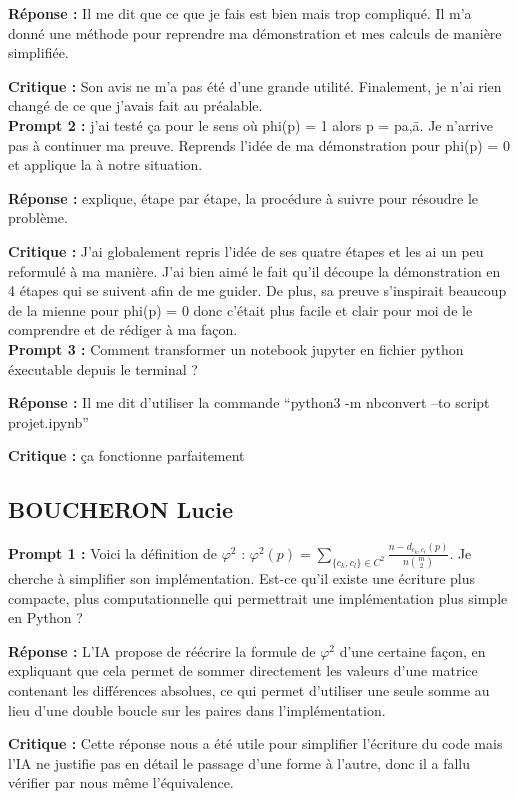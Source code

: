 \documentclass[11pt]{article}
\begin{document}
\textbf{Réponse :} Il me dit que ce que je fais est bien mais trop compliqué. Il m’a donné une méthode pour reprendre ma démonstration et mes calculs de manière simplifiée.

\textbf{Critique :} Son avis ne m’a pas été d’une grande utilité. Finalement, je n’ai rien changé de ce que j’avais fait au préalable.
\\

\textbf{Prompt 2 :} j’ai testé ça pour le sens où phi(p) = 1 alors p = pa,ā. Je n’arrive pas à continuer ma preuve. Reprends l’idée de ma démonstration pour phi(p) = 0 et applique la à notre situation.


\textbf{Réponse :} explique, étape par étape, la procédure à suivre pour résoudre le problème. 

\textbf{Critique :} J’ai globalement repris l’idée de ses quatre étapes et les ai un peu reformulé à ma manière. J’ai bien aimé le fait qu’il découpe la démonstration en 4 étapes qui se suivent afin de me guider. De plus, sa preuve s’inspirait beaucoup de la mienne pour phi(p) = 0 donc c’était plus facile et clair pour moi de le comprendre et de rédiger à ma façon.
\\

\textbf{Prompt 3 :} Comment transformer un notebook jupyter en fichier python éxecutable depuis le terminal ?

\textbf{Réponse :} Il me dit d’utiliser la commande “python3 -m nbconvert --to script projet.ipynb”

\textbf{Critique :} ça fonctionne parfaitement

\subsection{BOUCHERON Lucie}

\textbf{Prompt 1 :} Voici la définition de $\varphi^2$ : $\varphi^2(p) = \sum_{\{c_k,c_l\} \in C^2} \frac{n - d_{c_k,c_l}(p)}{n \binom{m}{2}}$. Je cherche à simplifier son implémentation. 
Est-ce qu’il existe une écriture plus compacte, plus computationnelle qui permettrait une implémentation plus simple en Python ?

\textbf{Réponse :}  L’IA propose de réécrire la formule de $\varphi^2$ d'une certaine façon, en expliquant que cela permet de sommer directement les valeurs d’une matrice contenant les différences absolues, ce qui permet d’utiliser une seule somme au lieu d’une double boucle sur les paires dans l’implémentation.

\textbf{Critique :} Cette réponse nous a été utile pour simplifier l’écriture du code mais l’IA ne justifie pas en détail le passage d’une forme à l’autre, donc il a fallu vérifier par nous même l’équivalence.
\\
\end{document}
